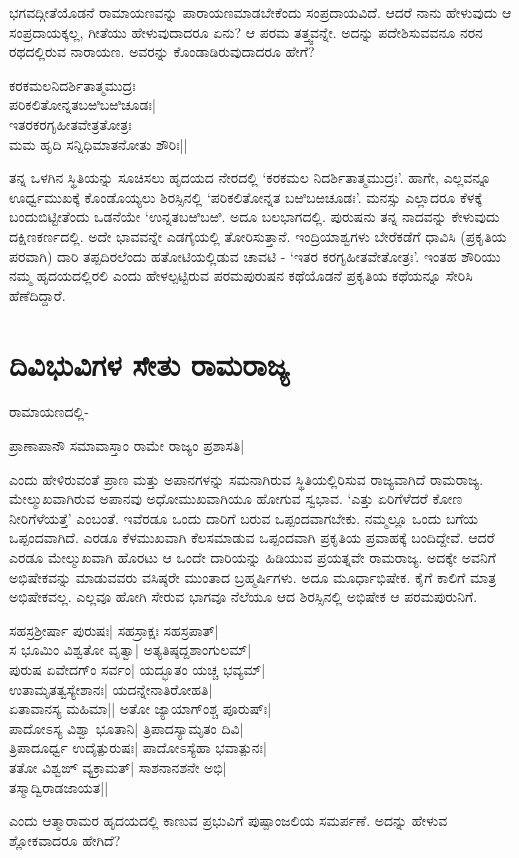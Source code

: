 ಭಗವದ್ಗೀತೆಯೊಡನೆ ರಾಮಾಯಣವನ್ನು ಪಾರಾಯಣಮಾಡಬೇಕೆಂದು ಸಂಪ್ರದಾಯವಿದೆ. ಆದರೆ ನಾನು ಹೇಳುವುದು ಆ ಸಂಪ್ರದಾಯಕ್ಕಲ್ಲ, ಗೀತೆಯು ಹೇಳುವುದಾದರೂ ಏನು? ಆ ಪರಮ ತತ್ತ್ವವನ್ನೇ. ಅದನ್ನು ಪದೇಶಿಸುವವನೂ ನರನ ರಥದಲ್ಲಿರುವ ನಾರಾಯಣ. ಅವರನ್ನು ಕೊಂಡಾಡಿರುವುದಾದರೂ ಹೇಗೆ?

\begin{shloka}
ಕರಕಮಲನಿದರ್ಶಿತಾತ್ಮಮುದ್ರಃ\\
ಪರಿಕಲಿತೋನ್ನತಬಱಿಬಱಿಚೂಡಃ|\\
ಇತರಕರಗೃಹೀತವೇತ್ರತೋತ್ರಃ\\
ಮಮ ಹೃದಿ ಸನ್ನಿಧಿಮಾತನೋತು ಶೌರಿಃ||
\end{shloka}

ತನ್ನ ಒಳಗಿನ ಸ್ಥಿತಿಯನ್ನು ಸೂಚಿಸಲು ಹೃದಯದ ನೇರದಲ್ಲಿ `ಕರಕಮಲ ನಿದರ್ಶಿತಾತ್ಮಮುದ್ರಃ'. ಹಾಗೇ, ಎಲ್ಲವನ್ನೂ ಊರ್ಧ್ವಮುಖಕ್ಕೆ ಕೊಂಡೊಯ್ಯಲು ಶಿರಸ್ಸಿನಲ್ಲಿ `ಪರಿಕಲಿತೋನ್ನತ ಬಱಿಬಱಚೂಡಃ'. ಮನಸ್ಸು ಎಲ್ಲಾದರೂ ಕೆಳಕ್ಕೆ ಬಂದುಬಿಟ್ಟೀತೆಂದು ಒಡನೆಯೇ `ಉನ್ನತಬಱಿಬಱಿ. ಅದೂ ಬಲಭಾಗದಲ್ಲಿ. ಪುರುಷನು ತನ್ನ ನಾದವನ್ನು ಕೇಳುವುದು ದಕ್ಷಿಣಕರ್ಣದಲ್ಲಿ. ಅದೇ ಭಾವವನ್ನೇ ಎಡಗೈಯಲ್ಲಿ ತೋರಿಸುತ್ತಾನೆ. ಇಂದ್ರಿಯಾಶ್ವಗಳು ಬೇರೆಕಡೆಗೆ ಧಾವಿಸಿ (ಪ್ರಕೃತಿಯ ಪರವಾಗಿ) ದಾರಿ ತಪ್ಪದಿರಲೆಂದು ಹತೋಟಿಯಲ್ಲಿಡುವ ಚಾವಟಿ - `ಇತರ ಕರಗೃಹೀತವೇತೋತ್ರಃ'. ಇಂತಹ ಶೌರಿಯು ನಮ್ಮ ಹೃದಯದಲ್ಲಿರಲಿ ಎಂದು ಹೇಳಲ್ಪಟ್ಟಿರುವ ಪರಮಪುರುಷನ ಕಥೆಯೊಡನೆ ಪ್ರಕೃತಿಯ ಕಥೆಯನ್ನೂ ಸೇರಿಸಿ ಹೆಣೆದಿದ್ದಾರೆ.  

\section*{ದಿವಿಭುವಿಗಳ ಸೇತು ರಾಮರಾಜ್ಯ}

ರಾಮಾಯಣದಲ್ಲಿ-

\begin{shloka}
ಪ್ರಾಣಾಪಾನೌ ಸಮಾವಾಸ್ತಾಂ ರಾಮೇ ರಾಜ್ಯಂ ಪ್ರಶಾಸತಿ|
\end{shloka}
ಎಂದು ಹೇಳಿರುವಂತೆ ಪ್ರಾಣ ಮತ್ತು ಅಪಾನಗಳನ್ನು ಸಮನಾಗಿರುವ ಸ್ಥಿತಿಯಲ್ಲಿರಿಸುವ ರಾಜ್ಯವಾಗಿದೆ ರಾಮರಾಜ್ಯ. ಮೇಲ್ಮುಖವಾಗಿರುವ ಅಪಾನವು ಅಧೋಮುಖವಾಗಿಯೂ ಹೋಗುವ ಸ್ವಭಾವ. `ಎತ್ತು ಏರಿಗೆಳೆದರೆ ಕೋಣ ನೀರಿಗೆಳೆಯತ್ತೆ' ಎಂಬಂತೆ. ಇವೆರಡೂ ಒಂದು ದಾರಿಗೆ ಬರುವ ಒಪ್ಪಂದವಾಗಬೇಕು. ನಮ್ಮಲ್ಲೂ ಒಂದು ಬಗೆಯ ಒಪ್ಪಂದವಾಗಿದೆ. ಎರಡೂ ಕೆಳಮುಖವಾಗಿ ಕೆಲಸಮಾಡುವ ಒಪ್ಪಂದವಾಗಿ ಪ್ರಕೃತಿಯ ಪ್ರವಾಹಕ್ಕೆ ಬಂದಿದ್ದೇವೆ. ಆದರೆ ಎರಡೂ ಮೇಲ್ಮುಖವಾಗಿ ಹೊರಟು ಆ ಒಂದೇ ದಾರಿಯನ್ನು ಹಿಡಿಯುವ ಪ್ರಯತ್ನವೇ ರಾಮರಾಜ್ಯ. ಅದಕ್ಕೇ ಅವನಿಗೆ ಅಭಿಷೇಕವನ್ನು ಮಾಡುವವರು ವಸಿಷ್ಠರೇ ಮುಂತಾದ ಬ್ರಹ್ಮರ್ಷಿಗಳು. ಅದೂ ಮೂರ್ಧಾಭಿಷೇಕ. ಕೈಗೆ ಕಾಲಿಗೆ ಮಾತ್ರ ಅಭಿಷೇಕವಲ್ಲ. ಎಲ್ಲವೂ ಹೋಗಿ ಸೇರುವ ಭಾಗವೂ ನೆಲೆಯೂ ಆದ ಶಿರಸ್ಸಿನಲ್ಲಿ ಅಭಿಷೇಕ ಆ ಪರಮಪುರುನಿಗೆ.

\begin{shloka}
ಸಹಸ್ರಶ್ರೀರ್ಷಾ ಪುರುಷಃ| ಸಹಸ್ರಾಕ್ಷಃ ಸಹಸ್ರಪಾತ್|\\
ಸ ಭೂಮಿಂ ವಿಶ್ವತೋ ವೃತ್ವಾ| ಅತ್ಯತಿಷ್ಠದ್ದಶಾಂಗುಲಮ್|\\
ಪುರುಷ ಏವೇದಗ್ಂ ಸರ್ವಂ| ಯದ್ಭೂತಂ ಯಚ್ಚ ಭವ್ಯಮ್|\\
ಉತಾಮೃತತ್ವಸ್ಯೇಶಾನಃ| ಯದನ್ನೇನಾತಿರೋಹತಿ|\\
ಏತಾವಾನಸ್ಯ ಮಹಿಮಾ|| ಅತೋ ಜ್ಯಾಯಾಗ್ಂಶ್ಚ ಪೂರುಷ್ಃ|\\
ಪಾದೋಽಸ್ಯ ವಿಶ್ವಾ ಭೂತಾನಿ|  ತ್ರಿಪಾದಸ್ಯಾಮೃತಂ ದಿವಿ|\\
ತ್ರಿಪಾದೂರ್ಧ್ವ ಉದೈತ್ಪುರುಷಃ| ಪಾದೋಽಸ್ಯೆಹಾ ಭವಾತ್ಪುನಃ|\\
ತತೋ ವಿಶ್ವಙ್ ವ್ಯಕ್ರಾಮತ್| ಸಾಶನಾನಶನೇ ಅಭಿ|\\
ತಸ್ಮಾದ್ವಿರಾಡಜಾಯತ||
\end{shloka}
ಎಂದು ಆತ್ಮಾರಾಮರ ಹೃದಯದಲ್ಲಿ ಕಾಣುವ ಪ್ರಭುವಿಗೆ ಪುಷ್ಪಾಂಜಲಿಯ ಸಮರ್ಪಣೆ. ಅದನ್ನು ಹೇಳುವ ಶ್ಲೋಕವಾದರೂ ಹೇಗಿದೆ?

